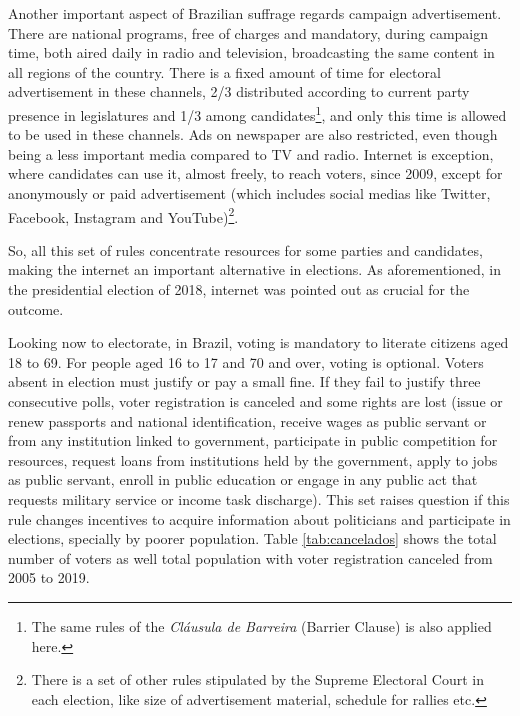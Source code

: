 \documentclass[
  12pt,
]{article}
\begin{document}
Another important aspect of Brazilian suffrage regards campaign
advertisement. There are national programs, free of charges and
mandatory, during campaign time, both aired daily in radio and
television, broadcasting the same content in all regions of the country.
There is a fixed amount of time for electoral advertisement in these
channels, 2/3 distributed according to current party presence in
legislatures and 1/3 among candidates\footnote{The same rules of the
  \emph{Cláusula de Barreira} (Barrier Clause) is also applied here.},
and only this time is allowed to be used in these channels. Ads on
newspaper are also restricted, even though being a less important media
compared to TV and radio. Internet is exception, where candidates can
use it, almost freely, to reach voters, since 2009, except for
anonymously or paid advertisement (which includes social medias like
Twitter, Facebook, Instagram and YouTube)\footnote{There is a set of
  other rules stipulated by the Supreme Electoral Court in each
  election, like size of advertisement material, schedule for rallies
  etc.}.

So, all this set of rules concentrate resources for some parties and
candidates, making the internet an important alternative in elections.
As aforementioned, in the presidential election of 2018, internet was
pointed out as crucial for the outcome.

Looking now to electorate, in Brazil, voting is mandatory to literate
citizens aged 18 to 69. For people aged 16 to 17 and 70 and over, voting
is optional. Voters absent in election must justify or pay a small fine.
If they fail to justify three consecutive polls, voter registration is
canceled and some rights are lost (issue or renew passports and national
identification, receive wages as public servant or from any institution
linked to government, participate in public competition for resources,
request loans from institutions held by the government, apply to jobs as
public servant, enroll in public education or engage in any public act
that requests military service or income task discharge). This set
raises question if this rule changes incentives to acquire information
about politicians and participate in elections, specially by poorer
population. Table \ref{tab:cancelados} shows the total number of voters
as well total population with voter registration canceled from 2005 to
2019.
\end{document}
